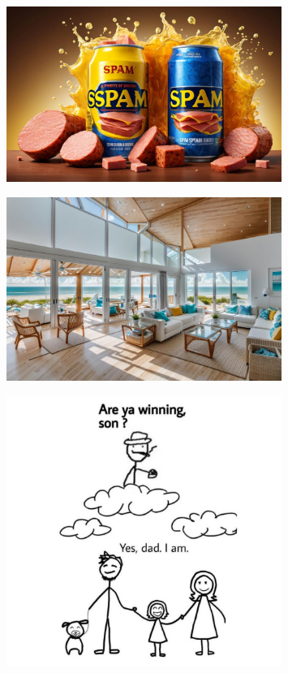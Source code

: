 \documentclass[a4paper]{article}
\begin{document}
\begin{figure}[htbp]
\centering
\includegraphics[width=0.8\textwidth]{meme-spam-drink.jpg}

\label{fig:meme-spam-drink}
\end{figure}

\begin{figure}[htbp]
\centering
\includegraphics[width=0.8\textwidth]{meme-good-design.jpg}

\label{fig:meme-good-design}
\end{figure}

\begin{figure}[htbp]
\centering
\includegraphics[width=0.8\textwidth]{meme-finally-won.jpeg}

\label{fig:meme-finally-won}
\end{figure}
\end{document}
